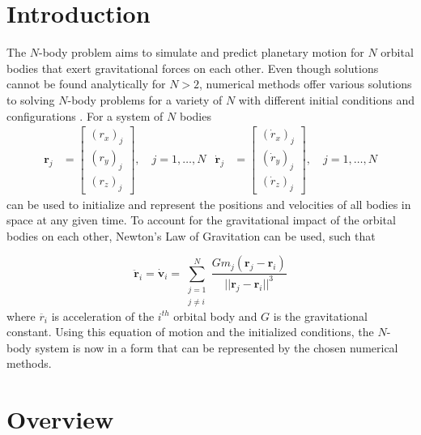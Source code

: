 \documentclass[conf]{new-aiaa}
\begin{document}
\section{Introduction}
The $N$-body problem aims to simulate and predict planetary motion for $N$ orbital bodies that exert gravitational forces on each other. Even though solutions cannot be found analytically for $N>2$, numerical methods offer various solutions to solving $N$-body problems for a variety of $N$ with different initial conditions and configurations \cite{britt}. For a system of $N$ bodies
\begin{align}
	\bm{r}_j &= \begin{bmatrix}
		(r_x)_j \\ (r_y)_j \\ (r_z)_j
	\end{bmatrix}, \quad j = 1, \dots, N
&
	\bm{\dot{r}}_j &= \begin{bmatrix}
		(\dot{r}_x)_j \\ (\dot{r}_y)_j \\ (\dot{r}_z)_j
	\end{bmatrix}, \quad j = 1, \dots, N
\end{align} 
can be used to initialize and represent the positions and velocities of all bodies in space at any given time. To account for the gravitational impact of the orbital bodies on each other, Newton's Law of Gravitation can be used, such that

\begin{equation}
	\bm{\ddot{r}}_i = \bm{\dot{v}}_i = \sum_{\substack{j=1 \\ j \ne i}} ^{N} \frac{G m_j (\bm{r}_j-\bm{r}_i)}{||\bm{r}_j-\bm{r}_i||^3} \label{rddot}	
\end{equation}
where $\ddot{r_i}$ is acceleration of the $i^{th}$ orbital body and $G$ is the gravitational constant. Using this equation of motion and the initialized conditions, the $N$-body system is now in a form that can be represented by the chosen numerical methods.
\section{Overview}
\end{document}
